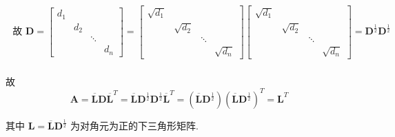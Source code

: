 \begin{tcolorbox}[enhanced,colback=10,colframe=9,breakable,coltitle=green!25!black,title=2024]
$$
\begin{array}{l}
\text { 故 } \boldsymbol{D}=\left[\begin{array}{llll}
d_{1} & & & \\
& d_{2} & & \\
& & \ddots & \\
& & & d_{n}
\end{array}\right]=\left[\begin{array}{llll}
\sqrt{d_{1}} & & & \\
& \sqrt{d_{2}} & & \\
& & \ddots & \\
& & & \sqrt{d_{n}}
\end{array}\right]\left[\begin{array}{llll}
\sqrt{d_{1}} & & & \\
& \sqrt{d_{2}} & & \\
& & \ddots & \\
& & & \sqrt{d_{n}}
\end{array}\right]=\boldsymbol{D}^{\frac{1}{2}} \boldsymbol{D}^{\frac{1}{2}} \\
\end{array}
$$

故
$$
\boldsymbol{A}=\overline{\boldsymbol{L}} \boldsymbol{D} \overline{\boldsymbol{L}}^{T}=\overline{\boldsymbol{L}} \boldsymbol{D}^{\frac{1}{2}} \boldsymbol{D}^{\frac{1}{2}} \overline{\boldsymbol{L}}^{T}=\left(\overline{\boldsymbol{L}} \boldsymbol{D}^{\frac{1}{2}}\right)\left(\overline{\boldsymbol{L}} \boldsymbol{D}^{\frac{1}{2}}\right)^{T}=\boldsymbol{L}^{T}
$$

其中 $ \boldsymbol{L}=\overline{\boldsymbol{L}} \boldsymbol{D}^{\frac{1}{2}} $ 为对角元为正的下三角形矩阵.
\end{tcolorbox}


